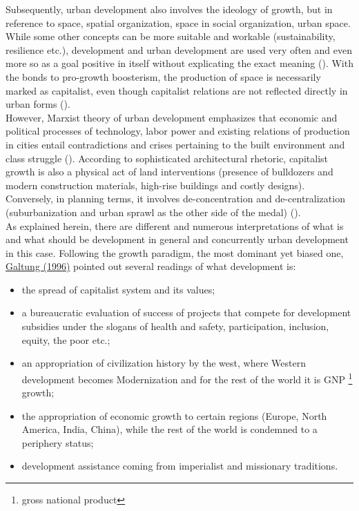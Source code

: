 \documentclass[11pt]{report}
\begin{document}
Subsequently, urban development also involves the ideology of growth, but in reference to space, spatial organization, space in social organization, urban space.
While some other concepts can be more suitable and workable (sustainability, resilience etc.), development and urban development are used very often and even more so as a goal positive in itself without explicating the exact meaning (\href{}{\cite{web of science results ivana popovic primer}}).
With the bonds to pro-growth boosterism, the production of space is necessarily marked as capitalist, even though capitalist relations are not reflected directly in urban forms (\href{Gottdiener}{\cite{Gottdiener1994}}). 
\\

However, Marxist theory of urban development emphasizes that economic and political processes of technology, labor power and existing relations of production in cities entail contradictions and crises pertaining to the built environment and class struggle (\href{Harvey}{\cite{Harvey1978}}).
According to sophisticated architectural rhetoric, capitalist growth is also a physical act of land interventions (presence of bulldozers and modern construction materials, high-rise buildings and costly designs).
Conversely, in planning terms, it involves de-concentration and de-centralization (suburbanization and urban sprawl as the other side of the medal) (\href{Gottdiener}{\cite{Gottdiener1994}}).
\\

As explained herein, there are different and numerous interpretations of what is and what should be development in general and concurrently urban development in this case.
Following the growth paradigm, the most dominant yet biased one, \href{Galtung}{Galtung (1996)} pointed out several readings of what development is:

\begin{itemize}
\item the spread of capitalist system and its values;
\item a bureaucratic evaluation of success of projects that compete for development subsidies under the slogans of health and safety, participation, inclusion, equity, the poor etc.;
\item an appropriation of civilization history by the west, where Western development becomes Modernization and for the rest of the world it is GNP
\footnote{gross national product}
growth; 
\item the appropriation of economic growth to certain regions (Europe, North America, India, China), while the rest of the world is condemned to a periphery status;
\item development assistance coming from imperialist and missionary traditions.
\end{itemize}
\end{document}
